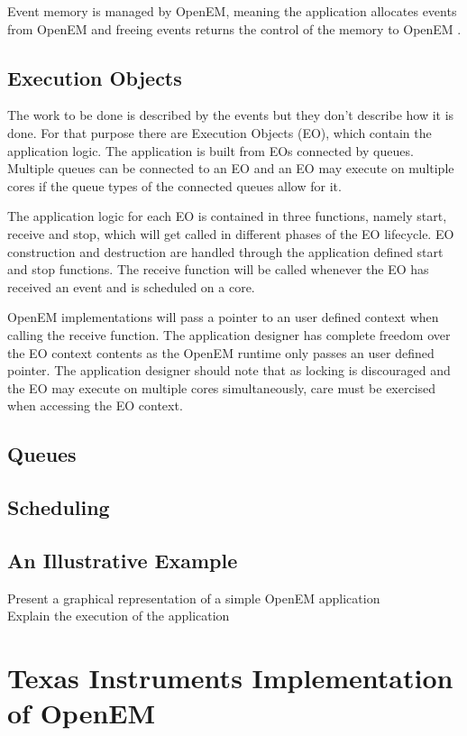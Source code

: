 Event memory is managed by OpenEM, meaning the application allocates events
from OpenEM and freeing events returns the control of the memory to OpenEM
\cite{openemintro}.
\subsection{Execution Objects}
\label{subsec:eos}
The work to be done is described by the events but they don't describe how it
is done. For that purpose there are Execution Objects (EO), which contain the
application logic. The application is built from EOs connected by queues.
Multiple queues can be connected to an EO and an EO may execute on multiple
cores if the queue types of the connected queues allow for it.
\cite{openemintro}

The application logic for each EO is contained in three functions, namely
start, receive and stop, which will get called in different phases of the EO
lifecycle. EO construction and destruction are handled through the application
defined start and stop functions. The receive function will be called whenever
the EO has received an event and is scheduled on a core. \cite{openemintro}

OpenEM implementations will pass a pointer to an user defined context when
calling the receive function. The application designer has complete freedom
over the EO context contents as the OpenEM runtime only passes an user defined
pointer. \cite{openemintro} The application designer should note that as
locking is discouraged and the EO may execute on multiple cores simultaneously,
care must be exercised when accessing the EO context.
\subsection{Queues}
\label{subsec:queues}
\subsection{Scheduling}
\label{subsec:schedule}
\subsection{An Illustrative Example}
\label{subsec:example}
Present a graphical representation of a simple OpenEM application\\
Explain the execution of the application

\section{Texas Instruments Implementation of OpenEM}
\label{sec:tiopenem}
